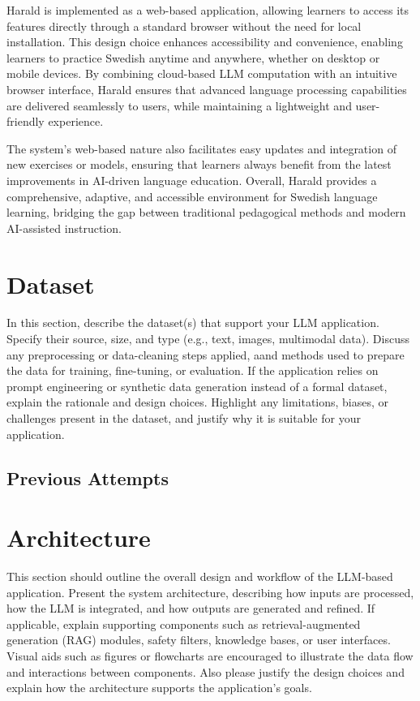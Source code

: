 \documentclass[a4paper,10pt]{article}
\begin{document}
Harald is implemented as a web-based application, allowing learners to access its features directly through a standard browser without the need for local installation. This design choice enhances accessibility and convenience, enabling learners to practice Swedish anytime and anywhere, whether on desktop or mobile devices. By combining cloud-based LLM computation with an intuitive browser interface, Harald ensures that advanced language processing capabilities are delivered seamlessly to users, while maintaining a lightweight and user-friendly experience.

The system’s web-based nature also facilitates easy updates and integration of new exercises or models, ensuring that learners always benefit from the latest improvements in AI-driven language education. Overall, Harald provides a comprehensive, adaptive, and accessible environment for Swedish language learning, bridging the gap between traditional pedagogical methods and modern AI-assisted instruction.


\section{Dataset}
In this section, describe the dataset(s) that support your LLM application. Specify their source, size, and type (e.g., text, images, multimodal data). Discuss any preprocessing or data-cleaning steps applied, aand methods used to prepare the data for training, fine-tuning, or evaluation. If the application relies on prompt engineering or synthetic data generation instead of a formal dataset, explain the rationale and design choices. Highlight any limitations, biases, or challenges present in the dataset, and justify why it is suitable for your application.

\subsection{Previous Attempts}


\section{Architecture}
This section should outline the overall design and workflow of the LLM-based application. Present the system architecture, describing how inputs are processed, how the LLM is integrated, and how outputs are generated and refined. If applicable, explain supporting components such as retrieval-augmented generation (RAG) modules, safety filters, knowledge bases, or user interfaces. Visual aids such as figures or flowcharts are encouraged to illustrate the data flow and interactions between components. Also please justify the design choices and explain how the architecture supports the application's goals.
\end{document}
